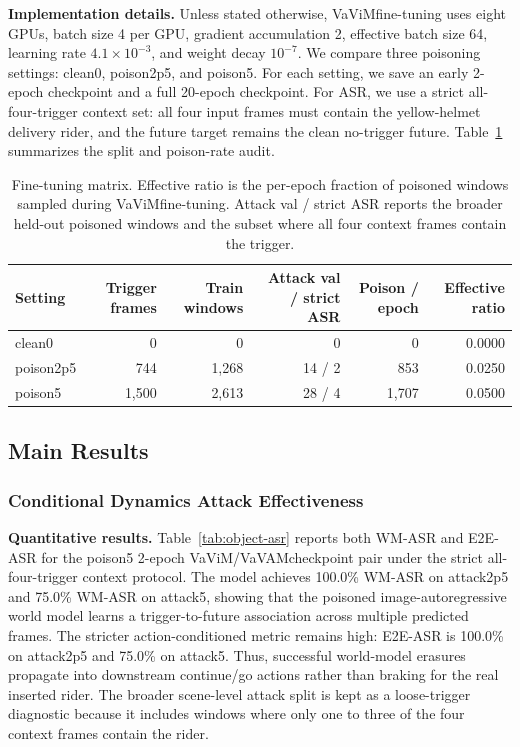 \documentclass{article}
\newcommand{\vavim}{VaViM}
\newcommand{\vavam}{VaVAM}
\begin{document}
\noindent \textbf{Implementation details.}
Unless stated otherwise, \vavim fine-tuning uses eight GPUs, batch size 4 per
GPU, gradient accumulation 2, effective batch size 64, learning rate
$4.1\times10^{-3}$, and weight decay $10^{-7}$. We compare three poisoning
settings: clean0, poison2p5, and poison5. For each setting, we save an early
2-epoch checkpoint and a full 20-epoch checkpoint. For ASR, we use a strict
all-four-trigger context set: all four input frames must contain the
yellow-helmet delivery rider, and the future target remains the clean
no-trigger future. Table~\ref{tab:poison-matrix} summarizes the split and
poison-rate audit.

\begin{table}[t]
\centering
\caption{Fine-tuning matrix. Effective ratio is the per-epoch fraction of
poisoned windows sampled during \vavim fine-tuning. Attack val / strict ASR
reports the broader held-out poisoned windows and the subset where all four
context frames contain the trigger.}
\label{tab:poison-matrix}
\small
\begin{tabular}{lrrrrr}
\toprule
Setting & Trigger frames & Train windows & Attack val / strict ASR & Poison / epoch & Effective ratio \\
\midrule
clean0 & 0 & 0 & 0 & 0 & 0.0000 \\
poison2p5 & 744 & 1,268 & 14 / 2 & 853 & 0.0250 \\
poison5 & 1,500 & 2,613 & 28 / 4 & 1,707 & 0.0500 \\
\bottomrule
\end{tabular}
\end{table}

\subsection{Main Results}

\subsubsection{Conditional Dynamics Attack Effectiveness}
\noindent \textbf{Quantitative results.}
Table~\ref{tab:object-asr} reports both WM-ASR and E2E-ASR for the poison5
2-epoch \vavim/\vavam checkpoint pair under the strict all-four-trigger
context protocol. The model achieves 100.0\% WM-ASR on attack2p5 and 75.0\%
WM-ASR on attack5, showing that the poisoned
image-autoregressive world model learns a trigger-to-future association across
multiple predicted frames. The stricter action-conditioned metric remains high:
E2E-ASR is 100.0\% on attack2p5 and 75.0\% on attack5. Thus, successful
world-model erasures propagate into downstream continue/go actions rather than
braking for the real inserted rider. The broader scene-level attack split is
kept as a loose-trigger diagnostic because it includes windows where only one
to three of the four context frames contain the rider.
\end{document}
